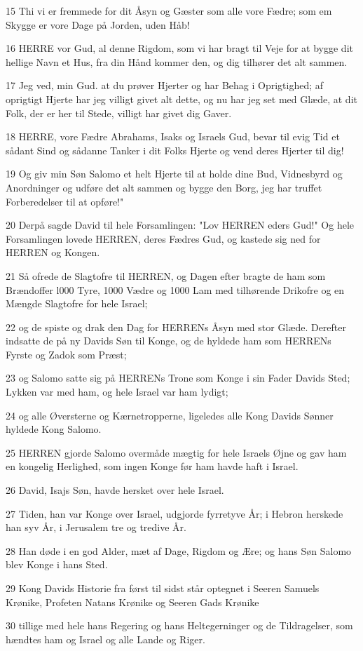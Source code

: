 \par 15 Thi vi er fremmede for dit Åsyn og Gæster som alle vore Fædre; som em Skygge er vore Dage på Jorden, uden Håb!
\par 16 HERRE vor Gud, al denne Rigdom, som vi har bragt til Veje for at bygge dit hellige Navn et Hus, fra din Hånd kommer den, og dig tilhører det alt sammen.
\par 17 Jeg ved, min Gud. at du prøver Hjerter og har Behag i Oprigtighed; af oprigtigt Hjerte har jeg villigt givet alt dette, og nu har jeg set med Glæde, at dit Folk, der er her til Stede, villigt har givet dig Gaver.
\par 18 HERRE, vore Fædre Abrahams, Isaks og Israels Gud, bevar til evig Tid et sådant Sind og sådanne Tanker i dit Folks Hjerte og vend deres Hjerter til dig!
\par 19 Og giv min Søn Salomo et helt Hjerte til at holde dine Bud, Vidnesbyrd og Anordninger og udføre det alt sammen og bygge den Borg, jeg har truffet Forberedelser til at opføre!"
\par 20 Derpå sagde David til hele Forsamlingen: "Lov HERREN eders Gud!" Og hele Forsamlingen lovede HERREN, deres Fædres Gud, og kastede sig ned for HERREN og Kongen.
\par 21 Så ofrede de Slagtofre til HERREN, og Dagen efter bragte de ham som Brændoffer l000 Tyre, 1000 Vædre og 1000 Lam med tilhørende Drikofre og en Mængde Slagtofre for hele Israel;
\par 22 og de spiste og drak den Dag for HERRENs Åsyn med stor Glæde. Derefter indsatte de på ny Davids Søn til Konge, og de hyldede ham som HERRENs Fyrste og Zadok som Præst;
\par 23 og Salomo satte sig på HERRENs Trone som Konge i sin Fader Davids Sted; Lykken var med ham, og hele Israel var ham lydigt;
\par 24 og alle Øversterne og Kærnetropperne, ligeledes alle Kong Davids Sønner hyldede Kong Salomo.
\par 25 HERREN gjorde Salomo overmåde mægtig for hele Israels Øjne og gav ham en kongelig Herlighed, som ingen Konge før ham havde haft i Israel.
\par 26 David, Isajs Søn, havde hersket over hele Israel.
\par 27 Tiden, han var Konge over Israel, udgjorde fyrretyve År; i Hebron herskede han syv År, i Jerusalem tre og tredive År.
\par 28 Han døde i en god Alder, mæt af Dage, Rigdom og Ære; og hans Søn Salomo blev Konge i hans Sted.
\par 29 Kong Davids Historie fra først til sidst står optegnet i Seeren Samuels Krønike, Profeten Natans Krønike og Seeren Gads Krønike
\par 30 tillige med hele hans Regering og hans Heltegerninger og de Tildragelser, som hændtes ham og Israel og alle Lande og Riger.


